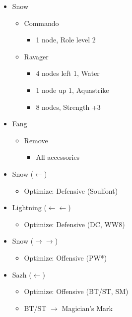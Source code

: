 \begin{multicols}{2}
\begin{menu}
\begin{itemize}
\begin{itemize}
\begin{itemize}
\begin{itemize}
					            \end{itemize}
				      \end{itemize}
				\item Snow
				      \begin{itemize}
					      \item Commando
					            \begin{itemize}
						            \item 1 node, Role level 2
					            \end{itemize}
					      \item Ravager
					            \begin{itemize}
						            \item 4 nodes left 1, Water
						            \item 1 node up 1, Aquastrike
						            \item 8 nodes, Strength +3
					            \end{itemize}
				      \end{itemize}
			\end{itemize}
			\equip
			\begin{itemize}
				\item Fang
				      \begin{itemize}
					      \item Remove
					            \begin{itemize}
						            \item All accessories
					            \end{itemize}
				      \end{itemize}
				\item Snow ($\leftarrow$)
				      \begin{itemize}
					      \item Optimize: Defensive (Soulfont)
				      \end{itemize}
				\item Lightning ($\leftarrow\leftarrow$)
				      \begin{itemize}
					      \item Optimize: Defensive (DC, WW8)
				      \end{itemize}
				\item Snow ($\rightarrow\rightarrow$)
				      \begin{itemize}
					      \item Optimize: Offensive (PW*)
				      \end{itemize}
				\item Sazh ($\leftarrow$)
				      \begin{itemize}
					      \item Optimize: Offensive (BT/ST, SM)
					      \item BT/ST $\rightarrow$ Magician's Mark
				      \end{itemize}
			\end{itemize}
		\end{itemize}
	\end{menu}


\end{multicols}
